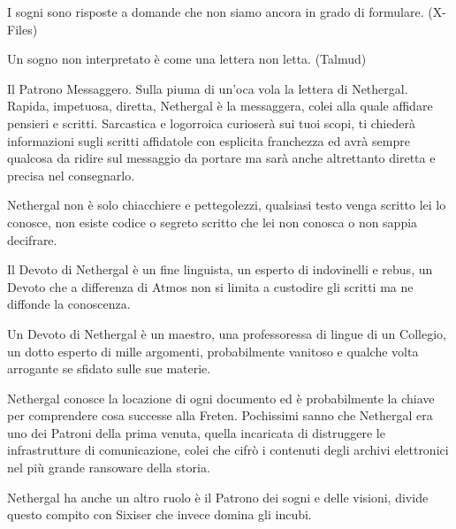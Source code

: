 \begin{multicols}{2}
\begin{changemargin}{0.3cm}{0.3cm}\begin{enfasi}{
I sogni sono risposte a domande che non siamo ancora in grado di formulare. (X-Files)

\medskip

Un sogno non interpretato è come una lettera non letta. (Talmud)
}\end{enfasi}\end{changemargin}\medskip

\medskip

Il Patrono Messaggero. Sulla piuma di un'oca vola la lettera di Nethergal. Rapida, impetuosa, diretta, Nethergal è la messaggera, colei alla quale affidare pensieri e scritti. Sarcastica e logorroica curioserà sui tuoi scopi, ti chiederà informazioni sugli scritti affidatole con esplicita franchezza ed avrà sempre qualcosa da ridire sul messaggio da portare ma sarà anche altrettanto diretta e precisa nel consegnarlo.

Nethergal non è solo chiacchiere e pettegolezzi, qualsiasi testo venga scritto lei lo conosce, non esiste codice o segreto scritto che lei non conosca o non sappia decifrare.

Il Devoto di Nethergal è un fine linguista, un esperto di indovinelli e rebus, un Devoto che a differenza di Atmos non si limita a custodire gli scritti ma ne diffonde la conoscenza.

Un Devoto di Nethergal è un maestro, una professoressa di lingue di un Collegio, un dotto esperto di mille argomenti, probabilmente vanitoso e qualche volta arrogante se sfidato sulle sue materie.

Nethergal conosce la locazione di ogni documento ed è probabilmente la chiave per comprendere cosa successe alla Freten. Pochissimi sanno che Nethergal era uno dei Patroni della prima venuta, quella incaricata di distruggere le infrastrutture di comunicazione, colei che cifrò i contenuti degli archivi elettronici nel più grande ransoware della storia.

Nethergal ha anche un altro ruolo è il Patrono dei sogni e delle visioni, divide questo compito con Sixiser che invece domina gli incubi.


\end{multicols}
